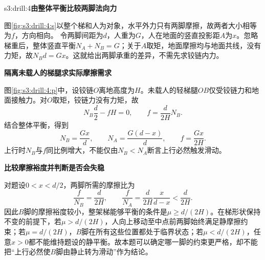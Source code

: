 \begin{drillsolution}{s3:drill:4}\textbf{由整体平衡比较两脚法向力}\par\nobreak
图\ref{fig:s3:drill:4:s}以整个梯和人为对象，水平外力只有两脚摩擦，故两者大小相等为$f$，方向相向。
令两脚间距为$d$，人重为$G$，人在地面的竖直投影距$A$为$x$。忽略梯重后，整体竖直平衡$N_A+N_B=G$；关于$A$取矩，地面摩擦均与地面共线，没有力矩，故$N_Bd=Gx$。这就给出两脚承重的差异，不需先求铰链内力。



\par\medskip{}\noindent\textbf{隔离未载人的梯腿求实际摩擦需求}\par\nobreak
图\ref{fig:s3:drill:4:p}中，设铰链$O$离地高度为$H$。未载人的轻梯腿$OB$仅受铰链力和地面接触力。对$O$取矩，铰链力没有力矩，故
\[
N_B\frac d2-fH=0,\qquad
f=\frac{d}{2H}N_B.
\]
结合整体平衡，得到
\[
N_B=\frac{Gx}{d},\qquad N_A=\frac{G(d-x)}d,\qquad
f=\frac{Gx}{2H}.
\]
上行时$N_B$与$f$同比例增大，不能仅由$N_B<N_A$断言上行必然触发滑动。

\par\medskip{}\noindent\textbf{比较摩擦裕度并判断是否会失稳}\par\nobreak
对题设$0<x<d/2$，两脚所需的摩擦比为
\[
\frac f{N_B}=\frac d{2H},\qquad
\frac f{N_A}=\frac d{2H}\frac{x}{d-x}<\frac d{2H}.
\]
因此$B$脚的摩擦裕度较小，整架梯能够平衡的条件是$\mu\ge d/(2H)$。在梯形状保持不变的前提下，若$\mu>d/(2H)$，人向上移动至中点前两脚始终满足静摩擦约束；若$\mu=d/(2H)$，$B$脚在所有这些位置都处于临界状态；若$\mu<d/(2H)$，任意$x>0$都不能维持题设的静平衡。故本题可以确定哪一脚的约束更严格，却不能把“上行必然使$B$脚由静止转为滑动”作为结论。\end{drillsolution}
